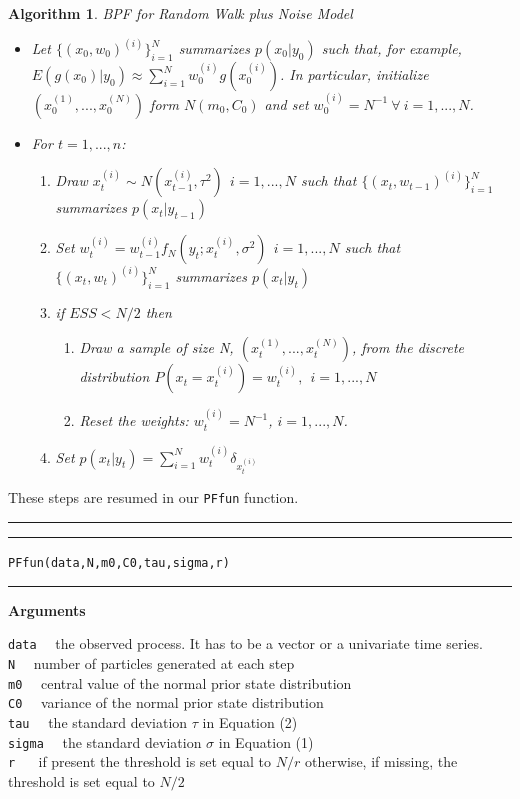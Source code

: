 \documentclass[
]{book}
\theoremstyle{break}
\theoremstyle{nonumberplain}
\newtheorem{algorithm}{Algorithm}[section]
\begin{document}
\begin{algorithm} BPF for Random Walk plus Noise Model
\begin{itemize}
\item Let $\{(x_{0},w_{0})^{(i)}\}_{i=1}^{N}$ summarizes $p(x_{0}|y_{0})$ such that, for example, $E(g(x_{0})|y_{0}) \approx \sum_{i=1}^{N}w_{0}^{(i)}g(x_{0}^{(i)})$. In particular, initialize $(x_{0}^{(1)},...,x_{0}^{(N)})$ form $N(m_{0},C_{0})$ and set $w_{0}^{(i)}=N^{-1} \ \forall \ i=1,...,N$.
\item For $t=1,...,n$:
\begin{enumerate}
\item Draw $x_{t}^{(i)} \sim N(x_{t-1}^{(i)},\tau^2) \ \ i=1,...,N$ such that $\{(x_{t},w_{t-1})^{(i)}\}_{i=1}^{N}$ summarizes $p(x_{t}|y_{t-1})$
\item Set $w_{t}^{(i)} = w_{t-1}^{(i)}f_{N}(y_{t};x_{t}^{(i)},\sigma^2) \ \ i=1,...,N$ such that $\{(x_{t},w_{t})^{(i)}\}_{i=1}^{N}$ summarizes $p(x_{t}|y_{t})$
\item if $ESS<N/2$ then
\begin{enumerate}
\item Draw a sample of size N, $(x_{t}^{(1)},...,x_{t}^{(N)})$, from the discrete distribution $P(x_{t}=x_{t}^{(i)})=w_{t}^{(i)},\ \ i=1,...,N$
\item Reset the weights: $w_{t}^{(i)}=N^{-1}$, $i=1,...,N$.
\end{enumerate}
\item Set $p(x_{t}|y_{t})=\sum_{i=1}^{N}w_{t}^{(i)}\delta_{x_{t}^{(i)}}$
\end{enumerate}
\end{itemize}
\end{algorithm}

These steps are resumed in our \texttt{PFfun} function.\\

\hrule
\hrule

\hfill\break
\texttt{PFfun(data,N,m0,C0,tau,sigma,r)}\\

\hrule

\textbf{Arguments}

\texttt{data} ~~the observed process. It has to be a vector or a
univariate time series.\\
\texttt{N} ~~number of particles generated at each step\\
\texttt{m0} ~~central value of the normal prior state distribution\\
\texttt{C0} ~~variance of the normal prior state distribution\\
\texttt{tau} ~~the standard deviation \(\tau\) in Equation (2)\\
\texttt{sigma} ~~the standard deviation \(\sigma\) in Equation (1)\\
\texttt{r} ~~ if present the threshold is set equal to \(N/r\)
otherwise, if missing, the threshold is set equal to \(N/2\)
\end{document}
